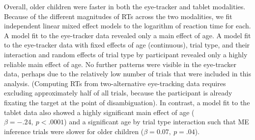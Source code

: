 \documentclass[man,noapacite]{apa2}
\begin{document}
Overall, older children were faster in both the eye-tracker and tablet modalities. Because of the different magnitudes of RTs across the two modalities, we fit independent linear mixed effect models to the logarithm of reaction time for each. A model fit to the eye-tracker data revealed only a main effect of age. A model fit to the eye-tracker data with fixed effects of age (continuous), trial type, and their interaction and random effects of trial type by participant revealed only a highly reliable main effect of age. No further patterns were visible in the eye-tracker data, perhaps due to the relatively low number of trials that were included in this analysis. (Computing RTs from two-alternative eye-tracking data requires excluding approximately half of all trials, because the participant is already fixating the target at the point of disambiguation). In contrast, a model fit to the tablet data also showed a highly significant main effect of age ($\beta=-.24,~p < .0001$) and a significant age by trial type interaction such that ME inference trials were slower for older children ($\beta = 0.07,~p =.04$).
\end{document}
